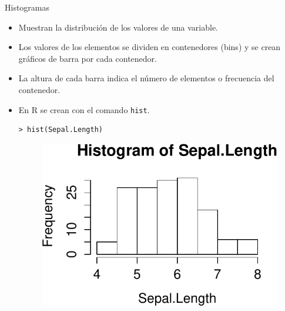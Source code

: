 \documentclass[handout]{beamer}
\begin{document}
\begin{frame}[fragile]{Histogramas}
\scriptsize{
\begin{itemize}
 \item Muestran la distribución de los valores de una variable.
 \item Los valores de los elementos se dividen en contenedores (bins) y se crean gráficos de barra por cada contenedor.
 \item La altura de cada barra indica el número de elementos o frecuencia del contenedor.
 \item En R se crean con el comando \verb+hist+.
 \begin{verbatim}
> hist(Sepal.Length)
 \end{verbatim}
 \begin{figure}[h!]
	\centering
	\includegraphics[scale=0.6]{pics/hist1.pdf}
	
	
\end{figure} 

\end{itemize}




}
\end{frame}
\end{document}
